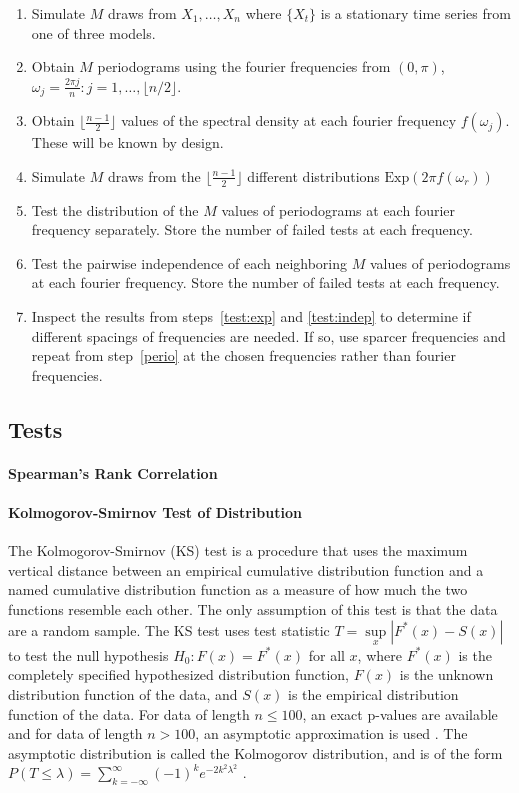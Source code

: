 \documentclass{article}\usepackage[]{graphicx}\usepackage[]{color}
\theoremstyle{plain}
\begin{document}
\begin{enumerate}
\item Simulate $M$ draws from $X_1,\dots, X_n$ where $\{X_t\}$ is a stationary time series from one of three models.
\item \label{perio}Obtain $M$ periodograms using the fourier frequencies from $(0, \pi)$, $\omega_j = \frac{2\pi j}{n}: j = 1, \dots, \lfloor n/2 \rfloor$.
\item Obtain $\lfloor\frac{n-1}{2}\rfloor$ values of the spectral density at each fourier frequency $f(\omega_j)$. These will be known by design.
\item Simulate $M$ draws from the $\lfloor\frac{n-1}{2}\rfloor$ different distributions $\text{Exp}(2\pi f(\omega_r))$
\item \label{test:exp}Test the distribution of the $M$ values of periodograms at each fourier frequency separately. Store the number of failed tests at each frequency.
\item \label{test:indep}Test the pairwise independence of each neighboring $M$ values of periodograms at each fourier frequency. Store the number of failed tests at each frequency.
\item Inspect the results from steps~\ref{test:exp} and \ref{test:indep} to determine if different spacings of frequencies are needed. If so, use sparcer frequencies and repeat from step~\ref{perio} at the chosen frequencies rather than fourier frequencies.
\end{enumerate}


\subsection{Tests}



\paragraph{Spearman's Rank Correlation}



\paragraph{Kolmogorov-Smirnov Test of Distribution}
The Kolmogorov-Smirnov (KS) test is a procedure that uses the maximum vertical distance between an empirical cumulative distribution function and a named cumulative distribution function as a measure of how much the two functions resemble each other. The only assumption of this test is that the data are a random sample. The KS test uses test statistic $T = \sup\limits_x |F^*(x) - S(x)|$ to test the null hypothesis $H_0: F(x) = F^*(x)$ for all $x$, where $F^*(x)$ is the completely specified hypothesized distribution function, $F(x)$ is the unknown distribution function of the data, and $S(x)$ is the empirical distribution function of the data. For data of length $n \le 100$, an exact p-values are available and for data of length $n > 100$, an asymptotic approximation is used \cite{conover1998practical}. The asymptotic distribution is called the Kolmogorov distribution, and is of the form $P(T \le \lambda) = \sum_{k=-\infty}^\infty (-1)^k e^{-2k^2 \lambda^2}$ \cite{kolmogorov1992empirical}.
\end{document}
